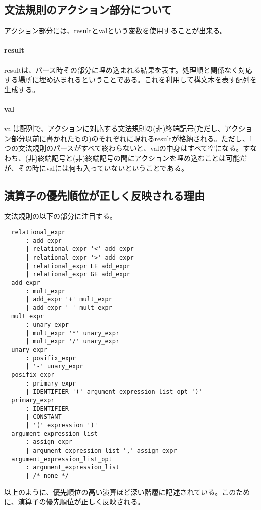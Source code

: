 \documentclass[titlepage, a4paper,12pt]{jarticle}
\begin{document}
\subsection{文法規則のアクション部分について}
アクション部分には、resultとvalという変数を使用することが出来る。
\paragraph{result}
resultは、パース時その部分に埋め込まれる結果を表す。処理順と関係なく対応する場所に埋め込まれるということである。これを利用して構文木を表す配列を生成する。
\paragraph{val}
valは配列で、アクションに対応する文法規則の(非)終端記号(ただし、アクション部分以前に書かれたもの)のそれぞれに現れるresultが格納される。ただし、1つの文法規則のパースがすべて終わらないと、valの中身はすべて空になる。すなわち、(非)終端記号と(非)終端記号の間にアクションを埋め込むことは可能だが、その時にvalには何も入っていないということである。
\subsection{演算子の優先順位が正しく反映される理由}
文法規則の以下の部分に注目する。
\begin{verbatim}
  relational_expr
      : add_expr
      | relational_expr '<' add_expr
      | relational_expr '>' add_expr
      | relational_expr LE add_expr
      | relational_expr GE add_expr
  add_expr
      : mult_expr
      | add_expr '+' mult_expr
      | add_expr '-' mult_expr
  mult_expr
      : unary_expr
      | mult_expr '*' unary_expr
      | mult_expr '/' unary_expr
  unary_expr
      : posifix_expr
      | '-' unary_expr
  posifix_expr
      : primary_expr
      | IDENTIFIER '(' argument_expression_list_opt ')'
  primary_expr
      : IDENTIFIER
      | CONSTANT
      | '(' expression ')'
  argument_expression_list
      : assign_expr
      | argument_expression_list ',' assign_expr
  argument_expression_list_opt
      : argument_expression_list
      | /* none */
\end{verbatim}
以上のように、優先順位の高い演算ほど深い階層に記述されている。このために、演算子の優先順位が正しく反映される。
\end{document}
